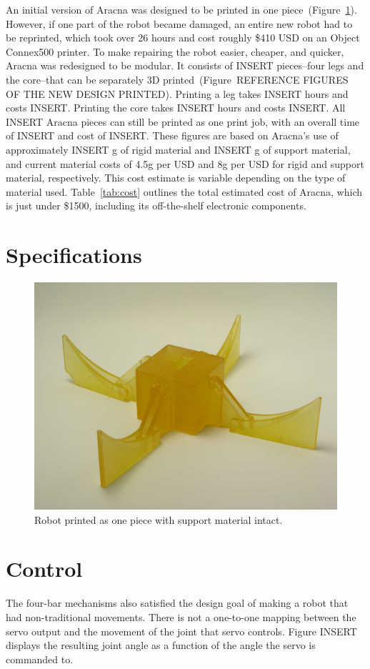 \documentclass[letterpaper]{article}
\begin{document}
An initial version of Aracna was designed to be printed in one piece~(Figure~\ref{notYetCleanedOnePieceRobot}). However, if one part of the robot became damaged, an entire new robot had to be reprinted, which took over 26 hours and cost roughly \$410 USD on an Object Connex500 printer. To make repairing the robot easier, cheaper, and quicker, Aracna was redesigned to be modular. It consists of INSERT pieces--four legs and the core--that can be separately 3D printed~(Figure~REFERENCE FIGURES OF THE NEW DESIGN PRINTED). Printing a leg takes INSERT hours and costs INSERT. Printing the core takes INSERT hours and costs INSERT. All INSERT Aracna pieces can still be printed as one print job, with an overall time of INSERT and cost of INSERT. These figures are based on Aracna's use of  approximately INSERT g of rigid material and INSERT g of support
material, and current material costs of 4.5g per USD and 8g per USD for rigid and support material, respectively. This cost estimate is variable depending on
the type of material used. Table~\ref{tab:cost} outlines the total estimated cost of Aracna, which is just under \$1500, including its off-the-shelf electronic components. 

\section{Specifications}

\begin{figure}[htb]
\begin{center}
\includegraphics[width=.37\textwidth]{fig2.jpg}
\caption{Robot printed as one piece with support material intact.}
\label{notYetCleanedOnePieceRobot}
\end{center}
\end{figure}


\section{Control}

The four-bar
mechanisms also satisfied the design goal of making a robot that had
non-traditional movements. There is not a one-to-one mapping between the servo output and the movement of the joint that servo controls. Figure INSERT displays the resulting joint angle as a function of the angle the servo is commanded to. 	
\end{document}
